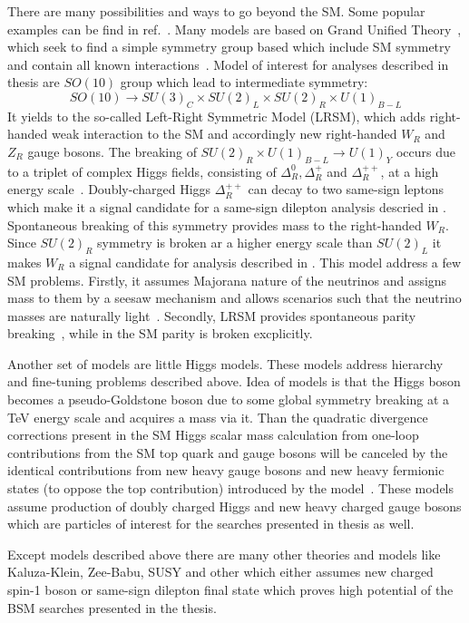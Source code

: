 There are many possibilities and ways to go beyond the SM. 
Some popular examples can be find in ref.~\cite{Ellis:2011jb}.
Many models are based on Grand Unified Theory~\cite{GUT_bigPaper},
which seek to find a simple symmetry group based which include SM symmetry
and contain all known interactions~\cite{Langacker:1984dc,Cvetic:1995zs}.
Model of interest for analyses described in thesis are $SO(10)$ group
which lead to intermediate symmetry:
\begin{equation}
SO(10) \to SU(3)_C \times SU(2)_L \times SU(2)_R \times U(1)_{B-L}
\end{equation}
It yields to the so-called Left-Right Symmetric Model (LRSM), which adds
right-handed weak interaction to the SM and accordingly new right-handed $W_R$ and $Z_R$ gauge bosons.
The breaking of $SU(2)_R \times U(1)_{B-L} \to U(1)_Y$ occurs due to a triplet of complex Higgs fields, consisting of $\Delta^0_R, \Delta^+_R$ and $\Delta^{++}_R$, at a high energy scale~\cite{Azuelos:2004mwa}.
Doubly-charged Higgs $\Delta^{++}_R$ can decay to two same-sign leptons which make it a signal candidate for a same-sign dilepton analysis descried in . Spontaneous breaking of this symmetry provides mass to the right-handed $W_R$.
Since $SU(2)_R$ symmetry is broken ar a higher energy scale than $SU(2)_L$ it makes
$W_R$ a signal candidate for analysis described in .
This model address a few SM problems. Firstly, it assumes Majorana nature of the neutrinos and assigns mass to them by a seesaw mechanism and allows scenarios such that the neutrino masses are naturally light~\cite{Mohapatra:1979ia}. 
Secondly, LRSM provides spontaneous parity breaking~\cite{Grimus:1993fx}, while in the SM parity is broken excplicitly.

Another set of models are little Higgs models.
These models address hierarchy and fine-tuning problems described above.
Idea of models is that the Higgs boson becomes a pseudo-Goldstone boson due to some global symmetry breaking at a TeV energy scale and acquires a mass via it.
Than the quadratic divergence corrections present in the SM Higgs scalar mass calculation from one-loop contributions from the SM top quark and gauge bosons will be canceled 
by the identical contributions from new heavy gauge bosons and new heavy fermionic states (to oppose the top contribution) introduced by the model~\cite{Han:2003wu,Brak}.
These models assume production of doubly charged Higgs and new heavy charged gauge bosons which are particles of interest for the searches presented in thesis as well.

Except models described above there are many other theories and models like Kaluza-Klein, Zee-Babu, SUSY and other which either assumes new charged spin-1 boson or same-sign dilepton final state which proves high potential of the BSM searches presented in the thesis.